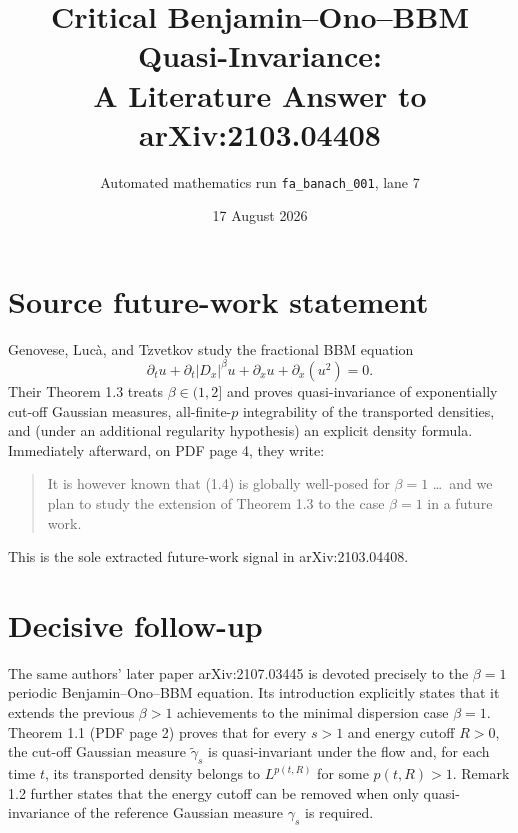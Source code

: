 \documentclass[11pt]{article}
\title{Critical Benjamin--Ono--BBM Quasi-Invariance:\\A Literature Answer to arXiv:2103.04408}
\author{Automated mathematics run \texttt{fa\_banach\_001}, lane 7}
\date{17 August 2026}
\begin{document}
\maketitle

\begin{center}
\end{center}

\section*{Source future-work statement}

Genovese, Luc\`a, and Tzvetkov study the fractional BBM equation
\[
 \partial_tu+\partial_t|D_x|^\beta u+\partial_xu+\partial_x(u^2)=0.
\]
Their Theorem 1.3 treats $\beta\in(1,2]$ and proves quasi-invariance of
exponentially cut-off Gaussian measures, all-finite-$p$ integrability of the
transported densities, and (under an additional regularity hypothesis) an
explicit density formula.  Immediately afterward, on PDF page 4, they write:
\begin{quote}
It is however known that (1.4) is globally well-posed for $\beta=1$ \dots\ and
we plan to study the extension of Theorem 1.3 to the case $\beta=1$ in a
future work.
\end{quote}
This is the sole extracted future-work signal in arXiv:2103.04408.

\section*{Decisive follow-up}

The same authors' later paper arXiv:2107.03445 is devoted precisely to the
$\beta=1$ periodic Benjamin--Ono--BBM equation.  Its introduction explicitly
states that it extends the previous $\beta>1$ achievements to the minimal
dispersion case $\beta=1$.  Theorem 1.1 (PDF page 2) proves that for every
$s>1$ and energy cutoff $R>0$, the cut-off Gaussian measure
$\widetilde\gamma_s$ is quasi-invariant under the flow and, for each time
$t$, its transported density belongs to $L^{p(t,R)}$ for some
$p(t,R)>1$.  Remark 1.2 further states that the energy cutoff can be removed
when only quasi-invariance of the reference Gaussian measure $\gamma_s$ is
required.
\end{document}
